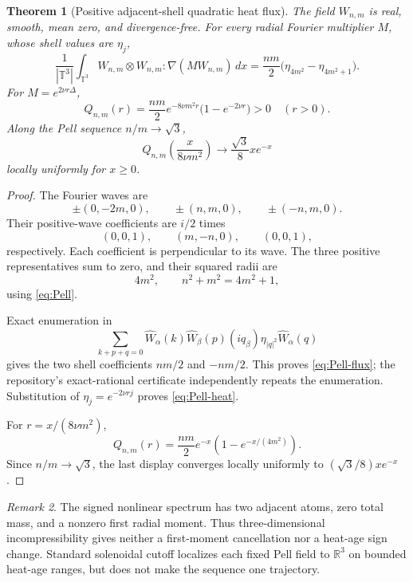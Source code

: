 \documentclass[11pt]{article}
\newtheorem{theorem}{Theorem}
\theoremstyle{remark}
\newtheorem{remark}[theorem]{Remark}
\newcommand{\R}{\mathbb R}
\newcommand{\T}{\mathbb T}
\begin{document}
\begin{theorem}[Positive adjacent-shell quadratic heat flux]
\label{thm:Pell}
The field \(W_{n,m}\) is real, smooth, mean zero, and divergence-free.
For every radial Fourier multiplier \(M\), whose shell values are
\(\eta_j\),
\begin{equation}
\label{eq:Pell-flux}
 \boxed{
 \frac1{|\T^3|}\int_{\T^3}
 W_{n,m}\otimes W_{n,m}:\nabla(MW_{n,m})\,dx
 =
 \frac{nm}{2}
 \bigl(\eta_{4m^2}-\eta_{4m^2+1}\bigr).
 }
\end{equation}
For \(M=e^{2\nu r\Delta}\),
\begin{equation}
\label{eq:Pell-heat}
 \boxed{
 Q_{n,m}(r)
 =
 \frac{nm}{2}e^{-8\nu m^2r}
 \bigl(1-e^{-2\nu r}\bigr)>0
 \quad(r>0).
 }
\end{equation}
Along the Pell sequence \(n/m\to\sqrt3\),
\begin{equation}
\label{eq:Pell-limit}
 \boxed{
 Q_{n,m}\left(\frac{x}{8\nu m^2}\right)
 \longrightarrow\frac{\sqrt3}{8}xe^{-x}
 }
\end{equation}
locally uniformly for \(x\ge0\).
\end{theorem}

\begin{proof}
The Fourier waves are
\[
 \pm(0,-2m,0),\qquad
 \pm(n,m,0),\qquad
 \pm(-n,m,0).
\]
Their positive-wave coefficients are \(i/2\) times
\[
 (0,0,1),\qquad(m,-n,0),\qquad(0,0,1),
\]
respectively.  Each coefficient is perpendicular to its wave.  The
three positive representatives sum to zero, and their squared radii are
\[
 4m^2,\qquad n^2+m^2=4m^2+1,
\]
using \eqref{eq:Pell}.

Exact enumeration in
\[
 \sum_{k+p+q=0}
 \widehat W_\alpha(k)\widehat W_\beta(p)
 (iq_\beta)\eta_{|q|^2}\widehat W_\alpha(q)
\]
gives the two shell coefficients \(nm/2\) and \(-nm/2\).  This proves
\eqref{eq:Pell-flux}; the repository's exact-rational certificate
independently repeats the enumeration.  Substitution of
\(\eta_j=e^{-2\nu rj}\) proves \eqref{eq:Pell-heat}.

For \(r=x/(8\nu m^2)\),
\[
 Q_{n,m}(r)
 =
 \frac{nm}{2}e^{-x}
 \left(1-e^{-x/(4m^2)}\right).
\]
Since \(n/m\to\sqrt3\), the last display converges locally uniformly to
\((\sqrt3/8)xe^{-x}\).
\end{proof}

\begin{remark}
The signed nonlinear spectrum has two adjacent atoms, zero total mass,
and a nonzero first radial moment.  Thus three-dimensional
incompressibility gives neither a first-moment cancellation nor a
heat-age sign change.  Standard solenoidal cutoff localizes each fixed
Pell field to \(\R^3\) on bounded heat-age ranges, but does not make the
sequence one trajectory.
\end{remark}
\end{document}
